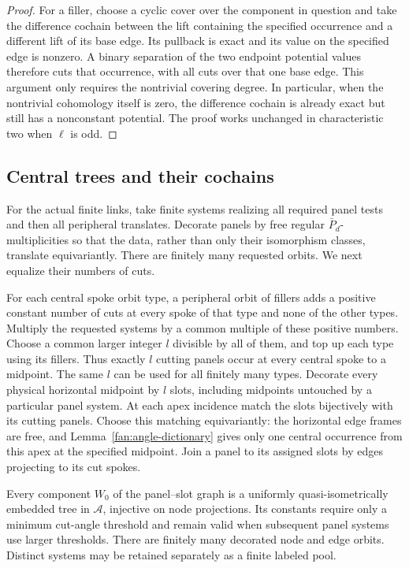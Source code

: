 \begin{proof}
For a filler, choose a cyclic cover over the component in question
and take the difference cochain between the lift containing the
specified occurrence and a different lift of its base edge.  Its
pullback is exact and its value on the specified edge is nonzero.
A binary separation of the two endpoint potential values therefore
cuts that occurrence, with all cuts over that one base edge.  This
argument only requires the nontrivial covering degree.  In particular,
when the nontrivial cohomology itself is zero, the difference cochain
is already exact but still has a nonconstant potential.  The proof
works unchanged in characteristic two when $\ell$ is odd.
\end{proof}

\subsection{Central trees and their cochains}

For the actual finite links, take finite systems realizing all required
panel tests and then all peripheral translates.  Decorate panels by
free regular $\bar P_d$-multiplicities so that the data, rather than only
their isomorphism classes, translate equivariantly.  There are finitely
many requested orbits.  We next equalize their numbers of cuts.

For each central spoke orbit type, a peripheral orbit of fillers adds
a positive constant number of cuts at every spoke of that type and
none of the other types.  Multiply the requested systems by a common
multiple of these positive numbers.  Choose a common larger integer
$l$ divisible by all of them, and top up each type using its fillers.
Thus exactly $l$ cutting panels occur at every central spoke to a
midpoint.  The same $l$ can be used for all finitely many types.
Decorate every physical horizontal midpoint by $l$ slots, including
midpoints untouched by a particular panel system.  At each apex
incidence match the slots bijectively with its cutting panels.
Choose this matching equivariantly: the horizontal edge frames are
free, and Lemma~\ref{fan:angle-dictionary} gives only one central
occurrence from this apex at the specified midpoint.  Join a panel
to its assigned slots by edges projecting to its cut spokes.

\begin{lemma}\label{fan:central-trees}
Every component $W_0$ of the panel--slot graph is a uniformly
quasi-isometrically embedded tree in $\mathcal A$, injective on node
projections.  Its constants require only a minimum cut-angle threshold
and remain valid when subsequent panel systems use larger thresholds.
There are finitely many decorated node and edge orbits.  Distinct
systems may be retained separately as a finite labeled pool.
\end{lemma}

